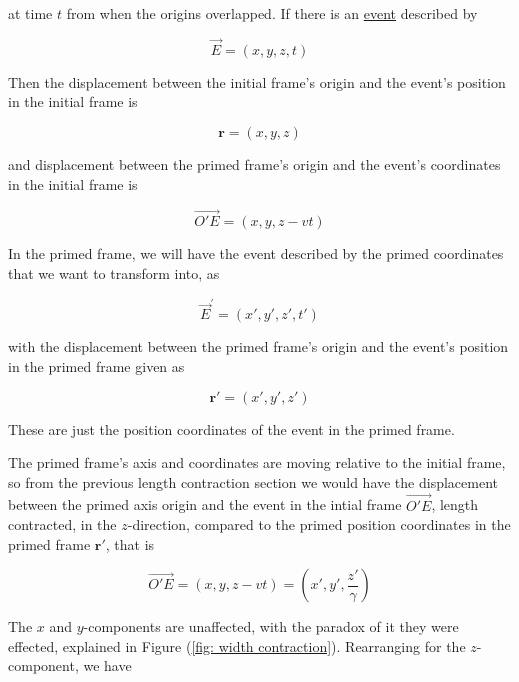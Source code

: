 at time ${t}$ from when the origins overlapped.
If there is an \hyperlink{def-event}{event} described by

\begin{equation}
	\vec{E} = ({x},{y},{z},{t})
\end{equation}

Then the displacement between the initial frame's origin and the event's position in the initial frame is

\begin{equation}
	\mathbf{r} = ({x},{y},{z})
\end{equation}

and displacement between the primed frame's origin and the event's coordinates in the initial frame is

\begin{equation}
	\vec{O'E} = ({x},{y},{z}-{v}{t})
\end{equation}

In the primed frame, we will have the event described by the primed coordinates that we want to transform into, as

\begin{equation}
	\vec{E}^{'} = ({x{'}},{y{'}},{z{'}},t{'})
\end{equation}

with the displacement between the primed frame's origin and the event's position in the primed frame given as

\begin{equation}
	{\mathbf{r}{'}} = ({x{'}},{y{'}},{z{'}})
\end{equation}

These are just the position coordinates of the event in the primed frame.

The primed frame's axis and coordinates are moving relative to the initial frame, so from the previous length contraction section we would have the displacement between the primed axis origin and the event in the intial frame $\vec{O'E}$, length contracted, in the $z$-direction, compared to the primed position coordinates in the primed frame ${\mathbf{r}{'}}$, that is

\begin{equation}
	\vec{O'E} = ({x},{y},{z}-{v}{t}) = ({x{'}},{y{'}},\frac{z{'}}{\gamma})
\end{equation}

The $x$ and $y$-components are unaffected, with the paradox of it they were effected, explained in Figure (\ref{fig: width contraction}).
Rearranging for the $z$-component, we have

